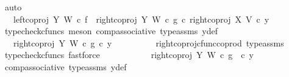 \begin{isabellebody}
\ auto\isanewline
\ \ \ \ \ \ \isamarkupfalse%
\ \isamarkupfalse%
\ {\isachardoublequoteopen}{\isachardot}{\kern0pt}{\isachardot}{\kern0pt}{\isachardot}{\kern0pt}\ {\isacharequal}{\kern0pt}\ {\isacharparenleft}{\kern0pt}{\isacharparenleft}{\kern0pt}{\isacharparenleft}{\kern0pt}left{\isacharunderscore}{\kern0pt}coproj\ Y\ W\ {\isasymcirc}\isactrlsub c\ f{\isacharparenright}{\kern0pt}\ {\isasymamalg}\ {\isacharparenleft}{\kern0pt}right{\isacharunderscore}{\kern0pt}coproj\ Y\ W\ {\isasymcirc}\isactrlsub c\ g{\isacharparenright}{\kern0pt}{\isacharparenright}{\kern0pt}\ {\isasymcirc}\isactrlsub c\ right{\isacharunderscore}{\kern0pt}coproj\ X\ V{\isacharparenright}{\kern0pt}\ {\isasymcirc}\isactrlsub c\ y{}{\isachardoublequoteclose}\isanewline
\ \ \ \ \ \ \ \ \isamarkupfalse%
\ {\isacharparenleft}{\kern0pt}typecheck{\isacharunderscore}{\kern0pt}cfuncs{\isacharcomma}{\kern0pt}\ meson\ comp{\isacharunderscore}{\kern0pt}associative{}\ type{\isacharunderscore}{\kern0pt}assms\ y{}{\isacharunderscore}{\kern0pt}def{\isacharparenright}{\kern0pt}\isanewline
\ \ \ \ \ \ \isamarkupfalse%
\ \isamarkupfalse%
\ {\isachardoublequoteopen}{\isachardot}{\kern0pt}{\isachardot}{\kern0pt}{\isachardot}{\kern0pt}\ {\isacharequal}{\kern0pt}\ {\isacharparenleft}{\kern0pt}right{\isacharunderscore}{\kern0pt}coproj\ Y\ W\ {\isasymcirc}\isactrlsub c\ g{\isacharparenright}{\kern0pt}\ {\isasymcirc}\isactrlsub c\ y{}{\isachardoublequoteclose}\isanewline
\ \ \ \ \ \ \ \ \isamarkupfalse%
\ right{\isacharunderscore}{\kern0pt}coproj{\isacharunderscore}{\kern0pt}cfunc{\isacharunderscore}{\kern0pt}coprod\ type{\isacharunderscore}{\kern0pt}assms\ \isamarkupfalse%
\ {\isacharparenleft}{\kern0pt}typecheck{\isacharunderscore}{\kern0pt}cfuncs{\isacharcomma}{\kern0pt}\ fastforce{\isacharparenright}{\kern0pt}\isanewline
\ \ \ \ \ \ \isamarkupfalse%
\ \isamarkupfalse%
\ {\isachardoublequoteopen}{\isachardot}{\kern0pt}{\isachardot}{\kern0pt}{\isachardot}{\kern0pt}\ {\isacharequal}{\kern0pt}\ right{\isacharunderscore}{\kern0pt}coproj\ Y\ W\ {\isasymcirc}\isactrlsub c\ g\ \ {\isasymcirc}\isactrlsub c\ y{}{\isachardoublequoteclose}\isanewline
\ \ \ \ \ \ \ \ \isamarkupfalse%
\ comp{\isacharunderscore}{\kern0pt}associative{}\ type{\isacharunderscore}{\kern0pt}assms{\isacharparenleft}{\kern0pt}{}{\isacharparenright}{\kern0pt}\ y{}{\isacharunderscore}{\kern0pt}def\ \isamarkupfalse%

\end{isabellebody}
